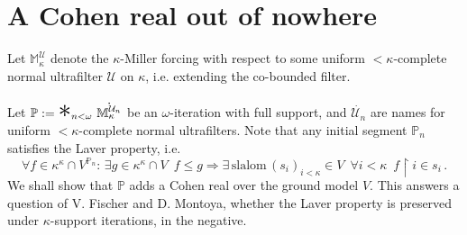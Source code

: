 \documentclass[14pt,a4paper]{scrartcl}
\theoremstyle{definition}
\numberwithin{equation}{section}
\begin{document}
\section*{A Cohen real out of nowhere}

Let $\mathbb{M}_\kappa ^{\mathcal{U}}$ denote the $\kappa$-Miller forcing with respect to some uniform ${<} \kappa$-complete normal ultrafilter $\mathcal{U}$ on $\kappa$, i.e. extending the co-bounded filter.\\
\\
Let $\mathbb{P}:= \mathlarger{\mathlarger{\mathlarger{\mathlarger{\mathlarger{*}}}}} _{n < \omega} \,\, \dot{\mathbb{M}_\kappa ^{\mathcal{U}_n}}$ be an $\omega$-iteration with full support, and $\dot{\mathcal{U}_n}$ are names for uniform ${<} \kappa$-complete normal ultrafilters. Note that any initial segment $\mathbb{P}_n$ satisfies the Laver property, i.e.
$$\forall f \in \kappa^{\kappa} \cap V^{\mathbb{P}_n}\colon \, \exists g \in \kappa^{\kappa} \cap V \,\,\,  f \leq g \Rightarrow \exists \, \text{slalom} \, (s_i)_{i < \kappa} \in V \,\,\, \forall i < \kappa \,\,\, f \restriction i \in s_i \, .$$
 We shall show that $\mathbb{P}$ adds a Cohen real over the ground model $V$. This answers a question of V. Fischer and D. Montoya, whether the Laver property is preserved under $\kappa$-support iterations, in the negative.\\
\end{document}
